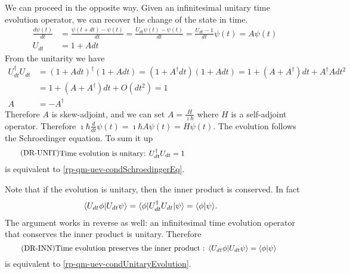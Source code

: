 We can proceed in the opposite way. Given an infinitesimal unitary time evolution operator, we can recover the change of the state in time.
\begin{equation}
	\begin{aligned}
		\frac{d\psi(t)}{dt} &= \frac{\psi(t+dt) - \psi(t)}{dt} = \frac{U_{dt}\psi(t) - \psi(t)}{dt} = \frac{U_{dt} - 1}{dt} \psi(t) = A \psi(t)\\
		U_{dt} &= 1 + A dt
	\end{aligned}
\end{equation}
From the unitarity we have
\begin{equation}
	\begin{aligned}
		U_{dt}^\dagger U_{dt} &= \left(1 + A dt\right)^\dagger \left(1 + A dt\right) = \left(1 + A^\dagger dt\right) \left(1 + A dt\right) = 1 + \left(A + A^\dagger\right)dt + A^\dagger A dt^2 \\
		&= 1 + \left(A + A^\dagger\right)dt + O(dt^2) = 1 \\
		A &= - A^\dagger
	\end{aligned}
\end{equation}
Therefore $A$ is skew-adjoint, and we can set $A = \frac{H}{\imath \hbar}$ where $H$ is a self-adjoint operator. Therefore $\imath \hbar \frac{d}{dt} \psi(t) = \imath \hbar A \psi(t) = H \psi(t)$. The evolution follows the Schroedinger equation. To sum it up
\begin{equation}\label{rp-qm-uev-condUnitaryEvolution}
	\tag{DR-UNIT}
	\eqtext{Time evolution is unitary: $U^{\dagger}_{dt} U_{dt} = 1$} 
\end{equation}
is equivalent to \ref{rp-qm-uev-condSchroedingerEq}.

Note that if the evolution is unitary, then the inner product is conserved. In fact
\begin{equation}
	\begin{aligned}
		\langle U_{dt} \phi | U_{dt} \psi\rangle &= \langle \phi | U^\dagger_{dt} U_{dt} | \psi \rangle =\langle  \phi | \psi \rangle.
	\end{aligned}
\end{equation}
The argument works in reverse as well: an infinitesimal time evolution operator that conserves the inner product is unitary. Therefore
\begin{equation}\label{rp-qm-uev-condInnerProductPreserved}
	\tag{DR-INN}
	\eqtext{Time evolution preserves the inner product : $\< U_{dt} \phi | U_{dt} \psi\> =\<  \phi | \psi \>$} 
\end{equation}
is equivalent to \ref{rp-qm-uev-condUnitaryEvolution}.

